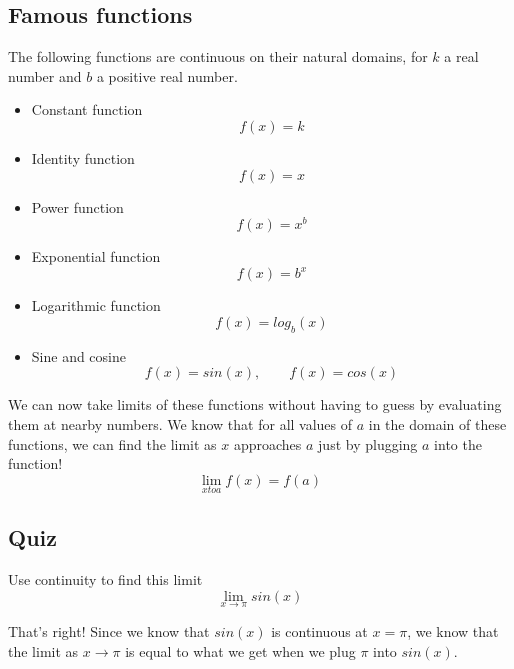 \documentclass{ximera}
\begin{document}
\subsection{Famous functions}

\begin{theorem}
    The following functions are continuous on their natural domains, for $k$ a real number and $b$ a positive real number.
    \begin{itemize}
        \item Constant function \[f(x)=k\]
        \item Identity function \[f(x)=x\]
        \item Power function \[f(x)=x^b\]
        \item Exponential function \[f(x)=b^x\]
        \item Logarithmic function \[f(x)=log_b(x)\]
        \item Sine and cosine \[f(x)=sin(x), \qquad f(x) = cos(x)\]
    \end{itemize}
\end{theorem}

We can now take limits of these functions without having to guess by evaluating them at nearby numbers. We know that for all values of $a$ in the domain of these functions, we can find the limit as $x$ approaches $a$ just by plugging $a$ into the function!
\[
    \lim_{x to a} f(x) = f(a)
\]

\subsection{Quiz}

\begin{question}
Use continuity to find this limit \[ \lim_{x \to \pi} sin(x) \]
\begin{multipleChoice}  
\end{multipleChoice}  

\begin{explanation}
    That's right! Since we know that $sin(x)$ is continuous at $x = \pi$, we know that the limit as $x \to \pi$ is equal to what we get when we plug $\pi$ into $sin(x)$.
\end{explanation}
\end{question}
\end{document}
